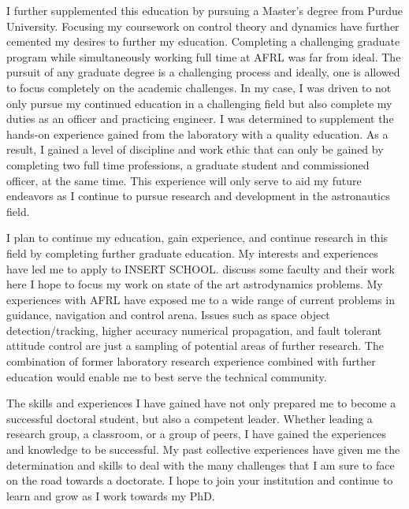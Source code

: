 \documentclass[12pt, oneside]{article}   	%
\begin{document}
I further supplemented this education by pursuing a Master's degree from Purdue University.
Focusing my coursework on control theory and dynamics have further cemented my desires to further my education.
Completing a challenging graduate program while simultaneously working full time at AFRL was far from ideal.
The pursuit of any graduate degree is a challenging process and ideally, one is allowed to focus completely on the academic challenges.
In my case, I was driven to not only pursue my continued education in a challenging field but also complete my duties as an officer and practicing engineer. 
I was determined to supplement the hands-on experience gained from the laboratory with a quality education.
As a result, I gained a level of discipline and work ethic that can only be gained by completing two full time professions, a graduate student and commissioned officer, at the same time.
This experience will only serve to aid my future endeavors as I continue to pursue research and development in the astronautics field.



I plan to continue my education, gain experience, and continue research in this field by completing further graduate education.   
My interests and experiences have led me to apply to {\Large INSERT SCHOOL}. 
{\Large discuss some faculty and their work here}
I hope to focus my work on state of the art astrodynamics problems. 
My experiences with AFRL have exposed me to a wide range of current problems in guidance, navigation and control arena. 
Issues such as space object detection/tracking, higher accuracy numerical propagation, and fault tolerant attitude control are just a sampling of potential areas of further research. 
The combination of former laboratory research experience combined with further education would enable me to best serve the technical community.


The skills and experiences I have gained have not only prepared me to become a successful doctoral student, but also a competent leader.
Whether leading a research group, a classroom, or a group of peers, I have gained the experiences and knowledge to be successful. 
My past collective experiences have given me the determination and skills to deal with the many challenges that I am sure to face on the road towards a doctorate. 
I hope to join your institution and continue to learn and grow as I work towards my PhD.


\end{document}

